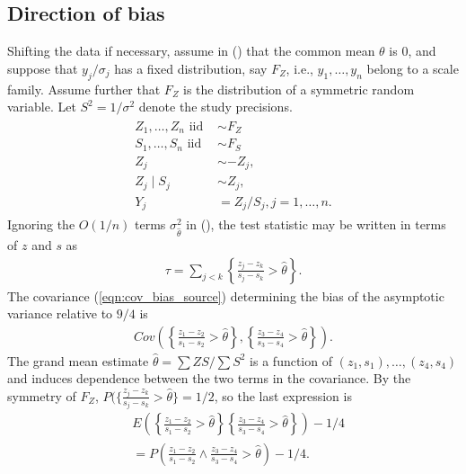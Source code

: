 \documentclass[12pt]{article}
\newcommand{\E}{E}
\renewcommand{\P}{P}
\newcommand{\cov}{Cov}
\newcommand{\z}{Z}
\newcommand{\y}{Y}
\newcommand{\s}{S}
\newcommand{\thetahat}{\hat{\theta}}
\begin{document}
    \subsection{Direction of bias}
    \label{section:theory:direction}

    Shifting the data if necessary, assume in ()
    that the common mean $\theta$ is $0$, and suppose that $y_j/\sigma_j$
    has a fixed distribution, say $F_Z$, i.e., 
    $y_1,\ldots,y_n$ belong to a scale
    family. %
    Assume
    further that $F_Z$ is the distribution of a symmetric random
    variable. Let $\s^2=1/\sigma^2$ denote the study precisions.
    \begin{align}
      \begin{split}
        \label{model:symmetric}
        \z_1,\ldots,\z_n \text{ iid } &\sim F_Z\\
        \s_1,\ldots,\s_n \text{ iid } &\sim F_S\\
        \z_j &\sim -\z_j,\\
        \z_j \mid \s_j &\sim \z_j,\\
        \y_j&=\z_j/\s_j,j=1,\ldots,n.
      \end{split}
    \end{align}
    Ignoring the $O(1/n)$ terms $\sigma_{\thetahat}^2$ in (), the test statistic may be written in terms of $z$ and $s$ as
    \begin{align}
      \tau=\sum_{j<k}\left\{\frac{z_j-z_k}{s_j-s_k}>\thetahat\right\}.
    \end{align}
    The covariance (\ref{eqn:cov_bias_source}) determining the bias of the asymptotic variance relative to $9/4$ is
    \begin{align}
      \cov\left(\left\{\frac{z_1-z_2}{s_1-s_2}>\thetahat\right\},\left\{\frac{z_3-z_4}{s_3-s_4}>\thetahat\right\} \right).
    \end{align}
    The grand mean estimate $\thetahat=\sum \z\s/\sum \s^2$ is a function of
    $(z_1,s_1),\ldots,(z_4,s_4)$ and induces dependence
    between the two terms in the covariance. By the symmetry of $F_Z$, $\P(\{\frac{z_j-z_k}{s_j-s_k}>\thetahat\}=1/2$, so the last expression is
    \begin{align}
      &\E\left(\left\{\frac{z_1-z_2}{s_1-s_2}>\thetahat\right\}\left\{\frac{z_3-z_4}{s_3-s_4}>\thetahat\right\}\right)-1/4\\
      &=\P\left(\frac{z_1-z_2}{s_1-s_2}\wedge\frac{z_3-z_4}{s_3-s_4}>\thetahat\right)-1/4.
    \end{align}    
\end{document}

